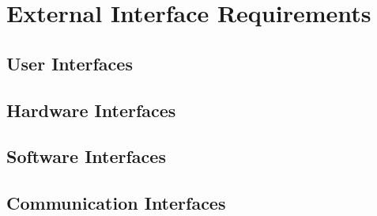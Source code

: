 \documentclass{article}
\begin{document}
\section{External Interface Requirements}
\subsection{User Interfaces}
\paragraph{}

\subsection{Hardware Interfaces}
\paragraph{}

\subsection{Software Interfaces}
\paragraph{}

\subsection{Communication Interfaces}
\paragraph{}
\end{document}
